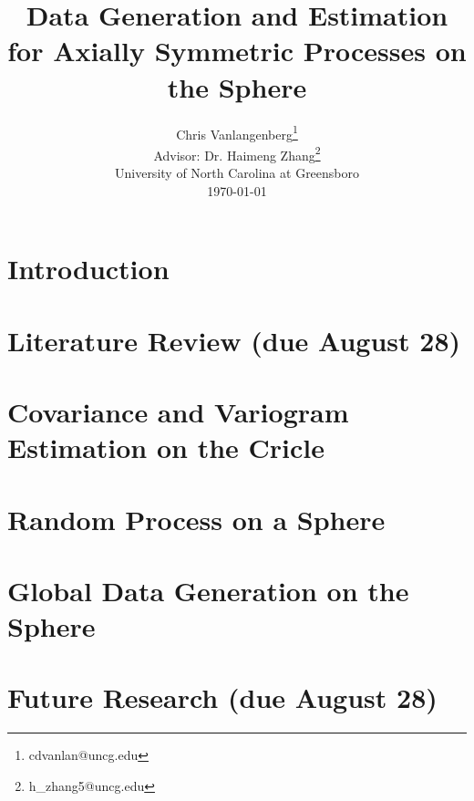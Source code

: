 
\usepackage{graphicx}

\usepackage{Sweave}




\title{{\bf\Large Data Generation and Estimation for Axially Symmetric Processes on the Sphere }}


\author{Chris Vanlangenberg\footnote{cdvanlan@uncg.edu} \\
\bigskip
Advisor: Dr. Haimeng Zhang\footnote{h\_zhang5@uncg.edu}\\ \small{University of North Carolina at Greensboro}\\
\small \today}

\maketitle 
\thispagestyle{empty}



\newpage
\chapter{Introduction}


\chapter{Literature Review (due August 28)}
%


\chapter{Covariance and Variogram Estimation on the Cricle}


\chapter{Random Process on a Sphere}


\chapter{Global Data Generation on the Sphere}


\chapter{Future Research (due August 28)}




